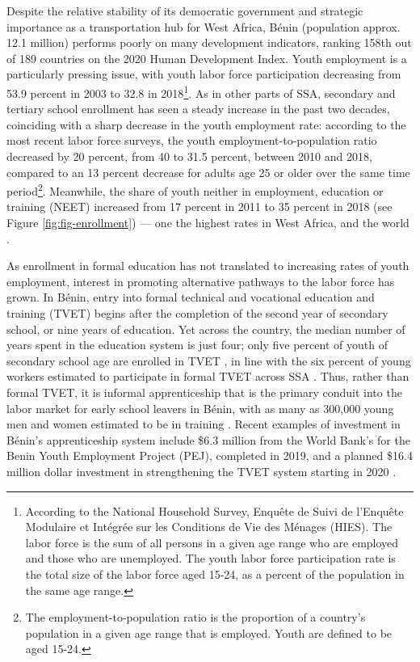 \documentclass[
  a4paper, twoside, 12pt]{book}
\begin{document}
Despite the relative stability of its democratic government and strategic importance as a transportation hub for West Africa, Bénin (population approx. 12.1 million) performs poorly on many development indicators, ranking 158th out of 189 countries on the 2020 Human Development Index. Youth employment is a particularly pressing issue, with youth labor force participation decreasing from 53.9 percent in 2003 to 32.8 in 2018\footnote{According to the National Household Survey, Enquête de Suivi de l'Enquête Modulaire et Intégrée sur les Conditions de Vie des Ménages (HIES). The labor force is the sum of all persons in a given age range who are employed and those who are unemployed. The youth labor force participation rate is the total size of the labor force aged 15-24, as a percent of the population in the same age range.}. As in other parts of SSA, secondary and tertiary school enrollment has seen a steady increase in the past two decades, coinciding with a sharp decrease in the youth employment rate: according to the most recent labor force surveys, the youth employment-to-population ratio decreased by 20 percent, from 40 to 31.5 percent, between 2010 and 2018, compared to an 13 percent decrease for adults age 25 or older over the same time period\footnote{The employment-to-population ratio is the proportion of a country's population in a given age range that is employed. Youth are defined to be aged 15-24.}. Meanwhile, the share of youth neither in employment, education or training (NEET) increased from 17 percent in 2011 to 35 percent in 2018 (see Figure \ref{fig:fig-enrollment}) --- one the highest rates in West Africa, and the world \autocite{ilo2022}.

As enrollment in formal education has not translated to increasing rates of youth employment, interest in promoting alternative pathways to the labor force has grown. In Bénin, entry into formal technical and vocational education and training (TVET) begins after the completion of the second year of secondary school, or nine years of education. Yet across the country, the median number of years spent in the education system is just four; only five percent of youth of secondary school age are enrolled in TVET \autocite{ilo2021}, in line with the six percent of young workers estimated to participate in formal TVET across SSA \autocite{hofmann2022}. Thus, rather than formal TVET, it is informal apprenticeship that is the primary conduit into the labor market for early school leavers in Bénin, with as many as 300,000 young men and women estimated to be in training \autocite{ilo2021}. Recent examples of investment in Bénin's apprenticeship system include \$6.3 million from the World Bank's for the Benin Youth Employment Project (PEJ), completed in 2019, and a planned \$16.4 million dollar investment in strengthening the TVET system starting in 2020 \autocite{worldbank2020c}.
\end{document}

